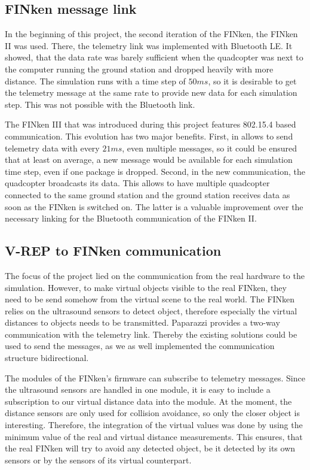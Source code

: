 \subsection{FINken message link}
\label{sec:messLink}
In the beginning of this project, the second iteration of the FINken, the FINken II was used. 
There, the telemetry link was implemented with Bluetooth LE.
It showed, that the data rate was barely sufficient when the quadcopter was next to the computer running the ground station and dropped heavily with more distance.
The simulation runs with a time step of $50ms$, so it is desirable to get the telemetry message at the same rate to provide new data for each simulation step.
This was not possible with the Bluetooth link.

The FINken III that was introduced during this project features 802.15.4 based communication.
This evolution has two major benefits.
First, in allows to send telemetry data with every $21ms$, even multiple messages, so it could be ensured that at least on average, a new message would be available for each simulation time step, even if one package is dropped.
Second, in the new communication, the quadcopter broadcasts its data.
This allows to have multiple quadcopter connected to the same ground station and the ground station receives data as soon as the FINken is switched on.
The latter is a valuable improvement over the necessary linking for the Bluetooth communication of the FINken II.



\subsection{V-REP to FINken communication}
The focus of the project lied on the communication from the real hardware to the simulation.
However, to make virtual objects visible to the real FINken, they need to be send somehow from the virtual scene to the real world.
The FINken relies on the ultrasound sensors to detect object, therefore especially the virtual distances to objects needs to be transmitted.
Paparazzi provides a two-way communication with the telemetry link.
Thereby the existing solutions could be used to send the messages, as we as well implemented the communication structure bidirectional.

The modules of the FINken's firmware can subscribe to telemetry messages.
Since the ultrasound sensors are handled in one module, it is easy to include a subscription to our virtual distance data into the module.
At the moment, the distance sensors are only used for collision avoidance, so only the closer object is interesting.
Therefore, the integration of the virtual values was done by using the minimum value of the real and virtual distance measurements.
This ensures, that the real FINken will try to avoid any detected object, be it detected by its own sensors or by the sensors of its virtual counterpart.



